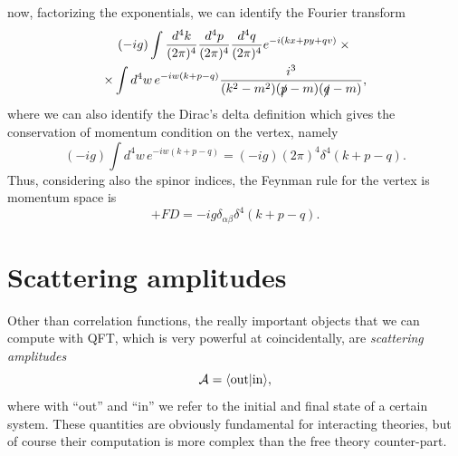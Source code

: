 now, factorizing the exponentials, we can identify the Fourier transform 
\begin{multline}
    (-ig)\int \frac{d^4k}{(2\pi)^4}\frac{d^4p}{(2\pi)^4}\frac{d^4q}{(2\pi)^4} e^{-i(kx + py + qv)} \times {} \\
    \times \int d^4w\,e^{-iw(k + p -q)}\frac{i^3}{(k^2 - m^2)(\sl{p} - m)(\sl{q} - m)},
\end{multline}
where we can also identify the Dirac's delta definition which gives the conservation of momentum condition on the vertex, namely
\begin{equation}
    (-ig)\int d^4w\,e^{-iw(k + p -q)} = (-ig)(2\pi)^4\delta^4(k + p - q).
\end{equation}
Thus, considering also the spinor indices, the Feynman rule for the vertex is momentum space is 
\begin{equation}
    +FD = -ig\delta_{\alpha\beta}\delta^4(k + p - q).
\end{equation}

\section{Scattering amplitudes}
Other than correlation functions, the really important objects that we can compute with QFT, which is very powerful at coincidentally, are \emph{scattering amplitudes}
\begin{equation}
    \amp = \mybraket{\rem{out}}{\rem{in}},
\end{equation}
where with ``out'' and ``in'' we refer to the initial and final state of a certain system. These quantities are obviously fundamental for interacting theories, but of course their computation is more complex than the free theory counter-part. 


